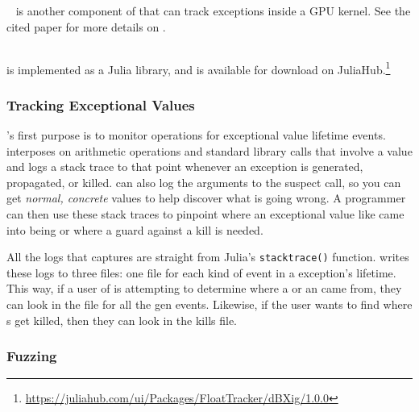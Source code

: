 \documentclass{juliacon}
\begin{document}
\GPUFPX~\cite{llsflg-hpdc-2023} is another component of \FlowFPX{} that can track \fp{} exceptions inside a GPU kernel.
See the cited paper for more details on \GPUFPX.


\subsection{\FT{}}
\label{s:floattracker}

\FT{} is implemented as a Julia library, and is available for download on JuliaHub.\footnote{\url{https://juliahub.com/ui/Packages/FloatTracker/dBXig/1.0.0}}

\subsubsection{Tracking Exceptional Values}
\label{s:trackingexceptionalvalues}

\FT{}'s first purpose is to monitor \fp{} operations for exceptional value lifetime events.
\FT{} interposes on arithmetic operations and standard library calls that involve a \fp{} value and logs a stack trace to that point whenever an exception is generated, propagated, or killed.
\FT{} can also log the arguments to the suspect call, so you can get \emph{normal, concrete} values to help discover what is going wrong.
A programmer can then use these stack traces to pinpoint where an exceptional value like \NaN{} came into being or where a guard against a \NaN{} kill is needed.

All the logs that \FT{} captures are straight from Julia's \texttt{stacktrace()} function.
\FT{} writes these logs to three files: one file for each kind of event in a \fp{} exception's lifetime.
This way, if a user of \FT{} is attempting to determine where a \NaN{} or an \Inf{} came from, they can look in the file for all the gen events.
Likewise, if the user wants to find where \NaN{}s get killed, then they can look in the kills file.

\subsubsection{Fuzzing}
\end{document}
